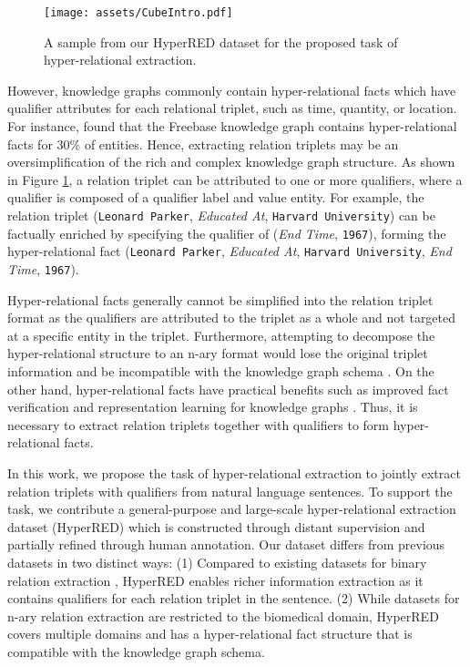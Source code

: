 \documentclass[11pt]{article}
\newcommand{\dataname}{HyperRED}
\begin{document}
\begin{figure}[!t]
\centering
\texttt{[image: assets/CubeIntro.pdf]}
\caption{
A sample from our \dataname{} dataset for the proposed task of hyper-relational extraction. 
\vspace{-5mm}}
\label{fig:example}
\end{figure}

However, knowledge graphs commonly contain hyper-relational facts \citep{10.1145/3308558.3313414} which have qualifier attributes for each relational triplet, such as time, quantity, or location.
For instance, \citet{10.5555/3060621.3060802} found that the Freebase knowledge graph contains hyper-relational facts for 30\% of entities.
Hence, extracting relation triplets may be an oversimplification of the rich and complex knowledge graph structure.
As shown in Figure \ref{fig:example}, a relation triplet can be attributed to one or more qualifiers, where a qualifier is composed of a qualifier label and value entity.
For example, the relation triplet (\texttt{Leonard Parker}, \textit{Educated At}, \texttt{Harvard University}) can be factually enriched by specifying the 
qualifier of (\textit{End Time}, \texttt{1967}), forming the hyper-relational fact (\texttt{Leonard Parker}, \textit{Educated At}, \texttt{Harvard University}, \textit{End Time}, \texttt{1967}).


Hyper-relational facts generally cannot be simplified into the relation triplet format as the qualifiers are attributed to the triplet as a whole and not targeted at a specific entity in the triplet.
Furthermore, attempting to decompose the hyper-relational structure to an n-ary format would lose the original triplet information and be incompatible with the knowledge graph schema \citep{10.1145/3366423.3380257}.
On the other hand, hyper-relational facts have practical benefits such as improved fact verification \citep{thorne-etal-2018-fever}
and representation learning for knowledge graphs \citep{galkin-etal-2020-message}.
Thus, it is necessary to extract relation triplets together with qualifiers to form hyper-relational facts.

In this work, we propose the task of hyper-relational extraction to jointly extract relation triplets with qualifiers from natural language sentences.
To support the task, we contribute a general-purpose and large-scale hyper-relational extraction dataset (\dataname{}) which is constructed through distant supervision \citep{mintz-etal-2009-distant} and partially refined through human annotation.
Our dataset differs from previous datasets in two distinct ways:
(1) Compared to existing datasets for binary relation extraction \citep{zhang-etal-2017-position, han-etal-2018-fewrel}, \dataname{} enables richer information extraction as it contains qualifiers for each relation triplet in the sentence. 
(2) While datasets for n-ary relation extraction \citep{jia-etal-2019-document} are restricted to the biomedical domain, \dataname{} covers multiple domains and has a hyper-relational fact structure that is compatible with the knowledge graph schema. 
\end{document}
